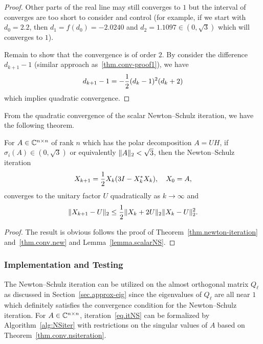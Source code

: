 \begin{proof}
    Other parts of the real line may still converges to $1$ but the interval of converges are too short to consider and control (for example, if we start with $d_0 = 2.2$, then $d_1 = f(d_0) = -2.0240$ and $d_2 = 1.1097 \in (0,\sqrt{3})$ which will converges to $1$).

    Remain to show that the convergence is of order $2$. By consider the difference $d_{k+1} - 1$ (similar approach as~\eqref{thm.conv-proof1}), we have 
    \begin{equation}\notag
        d_{k+1} - 1 = -\frac 12 (d_k-1)^2 (d_k + 2)
    \end{equation}
    which implies quadratic convergence.
\end{proof}

From the quadratic convergence of the scalar Newton--Schulz iteration, we have the following theorem.

\begin{theorem}
    \label{thm.conv.nsiteration}
    For $A\in\mathbb{C}^{n\times n}$ of rank $n$ which has the polar decomposition $A = UH$, if $\sigma_i(A) \in (0,\sqrt{3})$ or equivalently $\|{A}\|_2 < \sqrt{3}$, then the Newton--Schulz iteration 
    \begin{equation}\notag
        X_{k+1} = \frac 12 X_k(3I-X_k^* X_k),\quad X_0 = A,
    \end{equation}
    converges to the unitary factor $U$ quadratically as $k\to\infty$ and 
    \begin{equation}\label{eq.NSconv}
        \|{X_{k+1} - U}\|_2 \leq \frac 12 \|{X_k + 2U}\|_2 \|{X_k - U}\|_2^2.  
    \end{equation}
\end{theorem}

\begin{proof}
    The result is obvious follows the proof of Theorem~\ref{thm.newton-iteration} and~\ref{thm.conv.new} and Lemma~\ref{lemma.scalarNS}.
\end{proof}

\subsubsection{Implementation and Testing}

The Newton--Schulz iteration can be utilized on the almost orthogonal matrix $Q_\ell$ as discussed in Section~\ref{sec.approx-eig} since the eigenvalues of $Q_\ell$ are all near $1$ which definitely satisfies the convergence condition for the Newton--Schulz iteration. For $A\in\mathbb{C}^{n\times n}$, iteration~\eqref{eq.itNS} can be formalized by Algorithm~\ref{alg:NSiter} with restrictions on the singular values of $A$ based on Theorem~\ref{thm.conv.nsiteration}.


